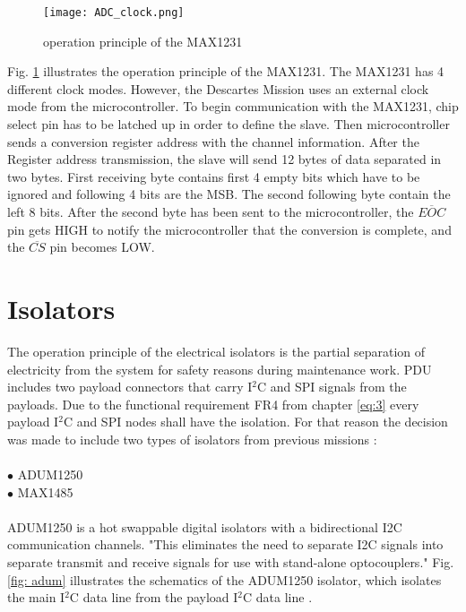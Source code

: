   
 
  \begin{figure}[h]
  	\centering
  	\texttt{[image: ADC\_clock.png]}
  	\caption{operation principle of the MAX1231 \cite{25}}
  	\label{fig: adc}
  \end{figure} 
 
 Fig. \ref{fig: adc} illustrates the operation principle of the MAX1231. The MAX1231 has 4 different clock modes. However, the Descartes Mission uses an external clock mode from the microcontroller. To begin communication with the MAX1231, chip select pin has to be latched up in order to define the slave. Then microcontroller sends a conversion register address with the channel information. After the Register address transmission, the slave will send 12 bytes of data separated in two bytes. First receiving byte contains first 4 empty bits which have to be ignored and following 4 bits are the MSB. The second following byte contain the left 8 bits. After the second byte has been sent to the microcontroller, the $ \overline {EOC} $ pin gets HIGH to notify the microcontroller that the conversion is complete, and the $ \overline {CS} $ pin becomes LOW.
 
 \section{Isolators}
 
The operation principle of the electrical isolators is the partial separation of electricity from the system for safety reasons during maintenance work. PDU includes two payload connectors that carry I$^2$C and SPI signals from the payloads. Due to the functional requirement FR4 from chapter \ref{eq:3} every payload I$^2$C and SPI nodes shall have the isolation. For that reason the decision was made to include two types of isolators from previous missions :\\ \\

$\bullet$ ADUM1250\\
$\bullet$ MAX1485\\ \\

ADUM1250 is a hot swappable digital isolators with a bidirectional I2C communication channels. "This eliminates the need to separate I2C signals into separate transmit and receive signals for use with stand-alone optocouplers." Fig. \ref{fig: adum} illustrates the schematics of the ADUM1250 isolator, which isolates the main I$^2$C data line from the payload I$^2$C data line \cite{30}.


